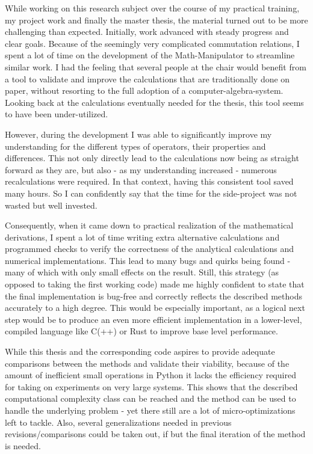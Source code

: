 While working on this research subject over the course of my practical training, my project work and finally the master thesis, the material turned out to be more challenging than expected.
Initially, work advanced with steady progress and clear goals.
Because of the seemingly very complicated commutation relations, I spent a lot of time on the development of the Math-Manipulator to streamline similar work.
I had the feeling that several people at the chair would benefit from a tool to validate and improve the calculations that are traditionally done on paper, without resorting to the full adoption of a computer-algebra-system.
Looking back at the calculations eventually needed for the thesis, this tool seems to have been under-utilized.

However, during the development I was able to significantly improve my understanding for the different types of operators, their properties and differences.
This not only directly lead to the calculations now being as straight forward as they are, but also - as my understanding increased - numerous recalculations were required.
In that context, having this consistent tool saved many hours.
So I can confidently say that the time for the side-project was not wasted but well invested.

Consequently, when it came down to practical realization of the mathematical derivations, I spent a lot of time writing extra alternative calculations and programmed checks to verify the correctness of the analytical calculations and numerical implementations.
This lead to many bugs and quirks being found - many of which with only small effects on the result. 
Still, this strategy (as opposed to taking the first \glqq working\grqq{} code) made me highly confident to state that the final implementation is bug-free and correctly reflects the described methods accurately to a high degree.
This would be especially important, as a logical next step would be to produce an even more efficient implementation in a lower-level, compiled language like C(++) or Rust to improve base level performance.

While this thesis and the corresponding code aspires to provide adequate comparisons between the methods and validate their viability, because of the amount of inefficient small operations in Python it lacks the efficiency required for taking on experiments on very large systems.
This shows that the described computational complexity class can be reached and the method can be used to handle the underlying problem - yet there still are a lot of micro-optimizations left to tackle.
Also, several generalizations needed in previous revisions/comparisons could be taken out, if but the final iteration of the method is needed.

